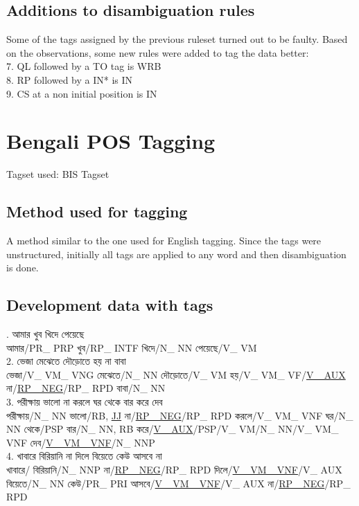\documentclass[11pt,a4paper,twocolumn]{article}
\begin{document}
	\subsection{Additions to disambiguation rules}
	Some of the tags assigned by the previous ruleset turned
	out to be faulty. Based on the observations, some new rules
	were added to tag the data better:\\
	7. QL followed by a TO tag is WRB\\
	8. RP followed by a IN* is IN\\
	9. CS at a non initial position is IN	\\
	\section{Bengali POS Tagging}
	Tagset used: BIS Tagset
	\subsection{Method used for tagging}
	A method similar to the one used for English tagging.
	Since the tags were unstructured, initially all tags
	are applied to any word and then disambiguation is 
	done.


	\subsection{Development data with tags}
	{. \textcolor{diff}{আমার খুব খিদে পেয়েছে} \\
	আমার/\textcolor{hlit}{PR\_ PRP}
	খুব/\textcolor{hlit}{RP\_ INTF}
	খিদে/\textcolor{hlit}{N\_ NN}
	পেয়েছে/\textcolor{hlit}{V\_ VM}\\
	$ $\\
	2. \textcolor{diff}{ভেজা মেঝেতে দৌড়োতে হয় না বাবা} \\
	ভেজা/\textcolor{hlit}{V\_ VM\_ VNG}
	মেঝেতে/\textcolor{hlit}{N\_ NN}
	দৌড়োতে/\textcolor{hlit}{V\_ VM}
	হয়/\textcolor{hlit}{V\_ VM\_ VF/\underline{V\_ AUX}}
	না/\textcolor{hlit}{\underline{RP\_ NEG}/RP\_ RPD}
	বাবা/\textcolor{hlit}{N\_ NN}\\
	$ $\\
	3. \textcolor{diff}{পরীক্ষায় ভালো না করলে ঘর থেকে বার করে দেব} \\
	পরীক্ষায়/\textcolor{hlit}{N\_ NN}
	ভালো/\textcolor{hlit}{RB, \underline{JJ}}
	না/\textcolor{hlit}{\underline{RP\_ NEG}/RP\_ RPD}
	করলে/\textcolor{hlit}{V\_ VM\_ VNF}
	ঘর/\textcolor{hlit}{N\_ NN}
	থেকে/\textcolor{hlit}{PSP}
	বার/\textcolor{hlit}{N\_ NN, RB}
	করে/\textcolor{hlit}{\underline{V\_ AUX}/PSP/V\_ VM/N\_ NN/V\_ VM\_ VNF}
	দেব/\textcolor{hlit}{\underline{V\_ VM\_ VNF}/N\_ NNP}\\
	$ $\\
	4. \textcolor{diff}{খাবারে বিরিয়ানি না দিলে বিয়েতে কেউ আসবে না} \\
	খাবারে/\textcolor{hlit}{}
	বিরিয়ানি/\textcolor{hlit}{N\_ NNP}
	না/\textcolor{hlit}{\underline{RP\_ NEG}/RP\_ RPD}
	দিলে/\textcolor{hlit}{\underline{V\_ VM\_ VNF}/V\_ AUX}
	বিয়েতে/\textcolor{hlit}{N\_ NN}
	কেউ/\textcolor{hlit}{PR\_ PRI}
	আসবে/\textcolor{hlit}{\underline{V\_ VM\_ VNF}/V\_ AUX}
	না/\textcolor{hlit}{\underline{RP\_ NEG}/RP\_ RPD}\\
	
	
	}
\end{document}
